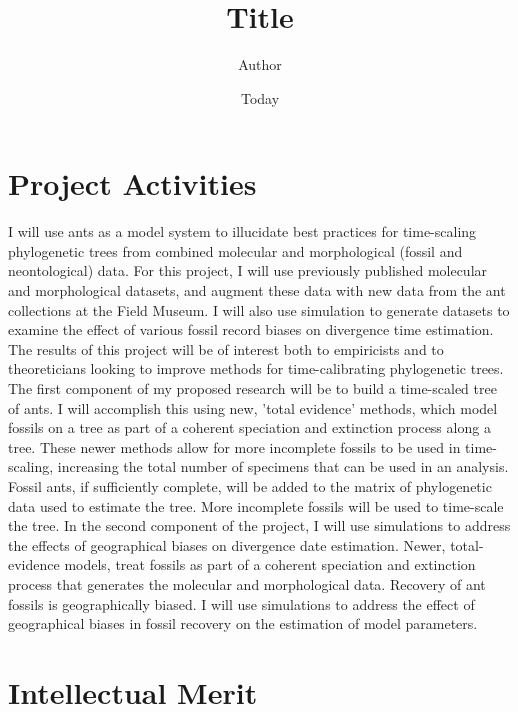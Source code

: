 \documentclass[]{article}
\begin{document}
\title{Title}
\author{Author}
\date{Today}
\maketitle

\section{Project Activities} 

I will use ants as a model system to illucidate best practices for time-scaling phylogenetic trees from combined molecular and morphological (fossil and neontological) data. For this project, I will use previously published molecular and morphological datasets, and augment these data with new data from the ant collections at the Field Museum. I will also use simulation to generate datasets to examine the effect of various fossil record biases on divergence time estimation. The results of this project will be of interest both to empiricists and to theoreticians looking to improve methods for time-calibrating phylogenetic trees.
The first component of my proposed research will be to build a time-scaled tree of ants. I will accomplish this using new, 'total evidence' methods, which model fossils on a tree as part of a coherent speciation and extinction process along a tree. These newer methods allow for more incomplete fossils to be used in time-scaling, increasing the total number of specimens that can be used in an analysis. Fossil ants, if sufficiently complete, will be added to the matrix of phylogenetic data used to estimate the tree. More incomplete fossils will be used to time-scale the tree.
In the second component of the project, I will use simulations to address the effects of geographical biases on divergence date estimation. Newer, total-evidence models, treat fossils as part of a coherent speciation and extinction process that generates the molecular and morphological data. Recovery of ant fossils is geographically biased. I will use simulations to address the effect of geographical biases in fossil recovery on the estimation of model parameters. 

\section{Intellectual Merit}
\end{document}
